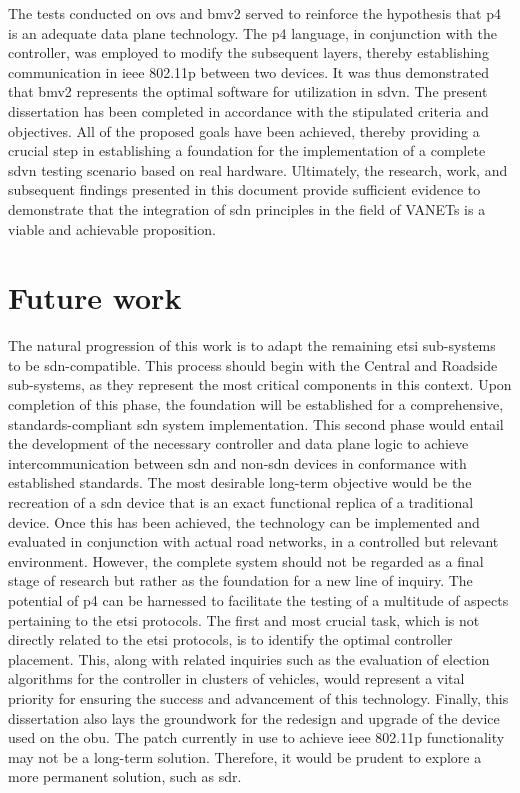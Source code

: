 The tests conducted on \gls{ovs} and \gls{bmv2} served to reinforce the hypothesis that \gls{p4} is an adequate data plane technology. The \gls{p4} language, in conjunction with the controller, was employed to modify the subsequent layers, thereby establishing communication in \gls{ieee} 802.11p between two devices. It was thus demonstrated that \gls{bmv2} represents the optimal software for utilization in \gls{sdvn}. 
The present dissertation has been completed in accordance with the stipulated criteria and objectives. All of the proposed goals have been achieved, thereby providing a crucial step in establishing a foundation for the implementation of a complete \gls{sdvn} testing scenario based on real hardware. Ultimately, the research, work, and subsequent findings presented in this document provide sufficient evidence to demonstrate that the integration of \gls{sdn} principles in the field of VANETs is a viable and achievable proposition.

\section{Future work}
The natural progression of this work is to adapt the remaining \gls{etsi} sub-systems to be \gls{sdn}-compatible. This process should begin with the Central and Roadside sub-systems, as they represent the most critical components in this context. 
Upon completion of this phase, the foundation will be established for a comprehensive, standards-compliant \gls{sdn} system implementation. This second phase would entail the development of the necessary controller and data plane logic to achieve intercommunication between \gls{sdn} and non-\gls{sdn} devices in conformance with established standards.
The most desirable long-term objective would be the recreation of a \gls{sdn} device that is an exact functional replica of a traditional device. Once this has been achieved, the technology can be implemented and evaluated in conjunction with actual road networks, in a controlled but relevant environment.
However, the complete system should not be regarded as a final stage of research but rather as the foundation for a new line of inquiry. The potential of \gls{p4} can be harnessed to facilitate the testing of a multitude of aspects pertaining to the \gls{etsi} protocols. The first and most crucial task, which is not directly related to the \gls{etsi} protocols, is to identify the optimal controller placement. This, along with related inquiries such as the evaluation of election algorithms for the controller in clusters of vehicles, would represent a vital priority for ensuring the success and advancement of this technology.
Finally, this dissertation also lays the groundwork for the redesign and upgrade of the device used on the \gls{obu}. The patch currently in use to achieve \gls{ieee} 802.11p functionality may not be a long-term solution. Therefore, it would be prudent to explore a more permanent solution, such as \gls{sdr}.
